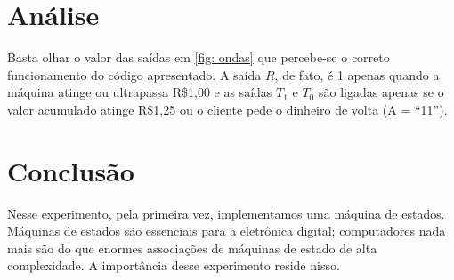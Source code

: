 \documentclass[a4paper,12pt]{article}
\begin{document}
\section{Análise}
Basta olhar o valor das saídas em \autoref{fig: ondas} que percebe-se o correto funcionamento do código apresentado. A saída $R$, de fato, é 1 apenas quando a máquina atinge ou ultrapassa R\$1,00 e as saídas $T_1$ e $T_0$ são ligadas apenas se o valor acumulado atinge R\$1,25 ou o cliente pede o dinheiro de volta (A = ``11'').

\section{Conclusão}
Nesse experimento, pela primeira vez, implementamos uma máquina de estados. Máquinas de estados são essenciais para a eletrônica digital; computadores nada mais são do que enormes associações de máquinas de estado de alta complexidade. A importância desse experimento reside nisso.
\end{document}

